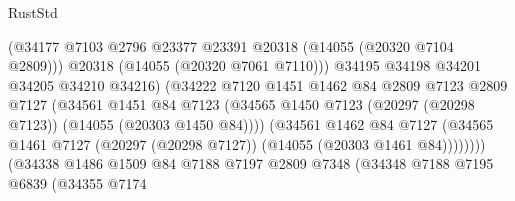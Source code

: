 \begin{lexlean}{RustStd}
\begin{coremodule}
                                        (@34177
                                          @7103
                                          @2796
                                          @23377
                                          @23391
                                          @20318
                                          (@14055 (@20320 @7104 @2809)))
                                        @20318
                                        (@14055 (@20320 @7061 @7110)))
                                      @34195
                                      @34198
                                      @34201
                                      @34205
                                      @34210
                                      @34216)
                                    (@34222
                                      @7120
                                      @1451
                                      @1462
                                      @84
                                      @2809
                                      @7123
                                      @2809
                                      @7127
                                      (@34561
                                        @1451
                                        @84
                                        @7123
                                        (@34565
                                          @1450
                                          @7123
                                          (@20297 (@20298 @7123))
                                          (@14055 (@20303 @1450 @84))))
                                      (@34561
                                        @1462
                                        @84
                                        @7127
                                        (@34565
                                          @1461
                                          @7127
                                          (@20297 (@20298 @7127))
                                          (@14055 (@20303 @1461 @84))))))))
                              (@34338
                                @1486
                                @1509
                                @84
                                @7188
                                @7197
                                @2809
                                @7348
                                (@34348
                                  @7188
                                  @7195
                                  @6839
                                  (@34355
                                    @7174

\end{coremodule}
\end{lexlean}
